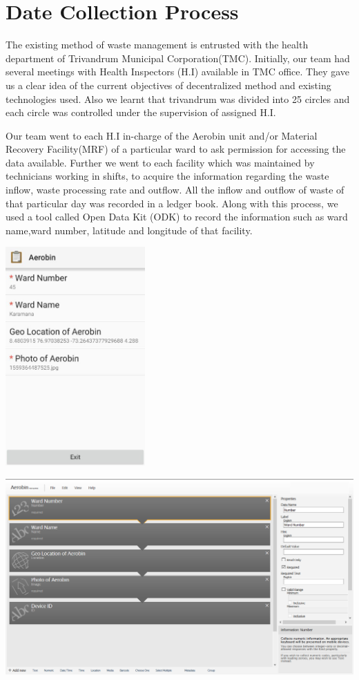 \documentclass[12pt,a4paper]{report}
\begin{document}
\chapter{\textbf{Date Collection Process}}
\begin{justify}
	The existing method of waste management is entrusted with the health department of Trivandrum Municipal Corporation(TMC). Initially, our team had several meetings with Health Inspectors (H.I) available in TMC office. They gave us a clear idea of the current objectives of decentralized method and existing technologies used. Also we learnt that trivandrum was divided into 25 circles and each circle was controlled under the supervision of assigned H.I.
	
	Our team went to each H.I in-charge of the Aerobin unit and/or Material Recovery Facility(MRF) of a particular ward to ask permission for accessing the data available. Further we went to each facility which was maintained by technicians working in shifts, to acquire the information regarding the waste inflow, waste processing rate and outflow. All the inflow and outflow of waste of that particular day was recorded in a ledger book. Along with this process, we used a tool called Open Data Kit (ODK) to record the information such as ward name,ward number, latitude and longitude of that facility.
	
	\vspace{5mm}
	\centering
	
	\includegraphics[width=0.4\textwidth]{odk}
	
	\includegraphics[width=1\textwidth]{ODKbuild}	


\end{justify}
\end{document}
